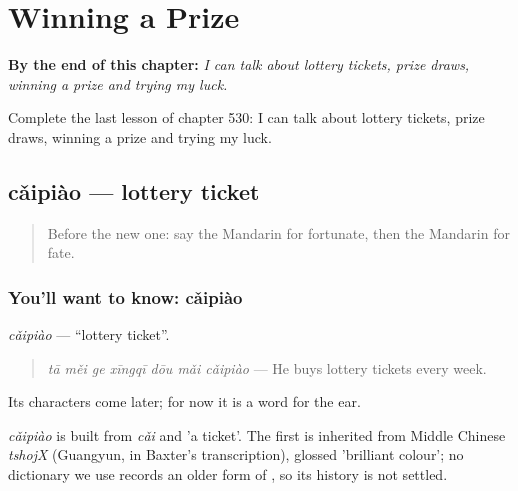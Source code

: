
\chapter{Winning a Prize}
\label{ch:zh-winning-a-prize}

\begin{chapteropening}
\textbf{By the end of this chapter:} \emph{I can talk about lottery tickets, prize draws, winning a prize and trying my luck.}

Complete the last lesson of chapter 530: I can talk about lottery tickets, prize draws, winning a prize and trying my luck.
\end{chapteropening}

\section[cǎipiào]{cǎipiào — lottery ticket}

\label{lesson:ZH-C530-caipiao}



\begin{quote}
Before the new one: say the Mandarin for fortunate, then the Mandarin for fate.
\end{quote}

\subsection*{You'll want to know: cǎipiào}
\emph{cǎipiào} — \textquotedblleft{}lottery ticket\textquotedblright{}.

\begin{quote}
\emph{tā měi ge xīngqī dōu mǎi cǎipiào} — He buys lottery tickets every week.
\end{quote}

Its characters come later; for now it is a word for the ear.

\begin{cousinweb}
\emph{cǎipiào} is built from \emph{cǎi} and  'a ticket'. The first is inherited from Middle Chinese \emph{tshojX} (Guangyun, in Baxter's transcription), glossed 'brilliant colour'; no dictionary we use records an older form of , so its history is not settled.
\end{cousinweb}

